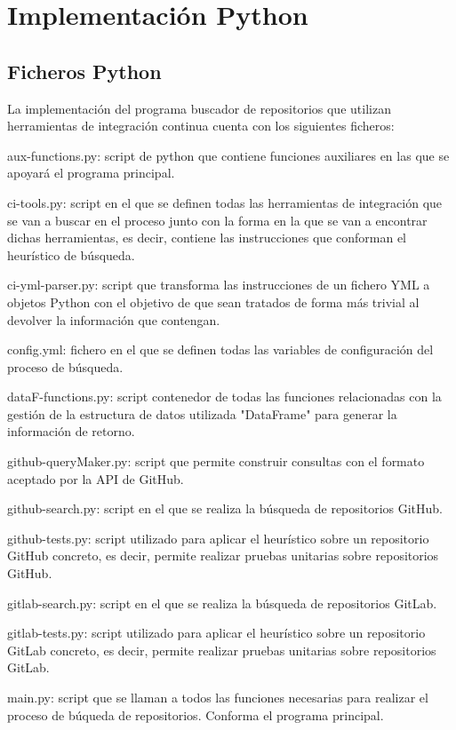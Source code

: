 \section{Implementación Python}

\subsection{Ficheros Python}
La implementación del programa buscador de repositorios que utilizan herramientas de integración continua cuenta con los siguientes ficheros:
\begin{compactitem}
    \item aux-functions.py: script de python que contiene funciones auxiliares en las que se apoyará el programa principal.
    \item ci-tools.py: script en el que se definen todas las herramientas de integración que se van a buscar en el proceso junto con la forma en la que se van a encontrar dichas herramientas, es decir, contiene las instrucciones que conforman el heurístico de búsqueda.
    \item ci-yml-parser.py: script que transforma las instrucciones de un fichero YML a objetos Python con el objetivo de que sean tratados  de forma más trivial al devolver la información que contengan.
    \item config.yml: fichero en el que se definen todas las variables de configuración del proceso de búsqueda.
    \item dataF-functions.py: script contenedor de todas las funciones relacionadas con la gestión de la estructura de datos utilizada "DataFrame" para generar la información de retorno.
    \item github-queryMaker.py: script que permite construir consultas con el formato aceptado por la API de GitHub.
    \item github-search.py: script en el que se realiza la búsqueda de repositorios GitHub.
    \item github-tests.py: script utilizado para aplicar el heurístico sobre un repositorio GitHub concreto, es decir, permite realizar pruebas unitarias sobre repositorios GitHub.
    \item gitlab-search.py: script en el que se realiza la búsqueda de repositorios GitLab.
    \item gitlab-tests.py: script utilizado para aplicar el heurístico sobre un repositorio GitLab concreto, es decir, permite realizar pruebas unitarias sobre repositorios GitLab.
    \item main.py: script que se llaman a todos las funciones necesarias para realizar el proceso de búqueda de repositorios. Conforma el programa principal.
\end{compactitem}

